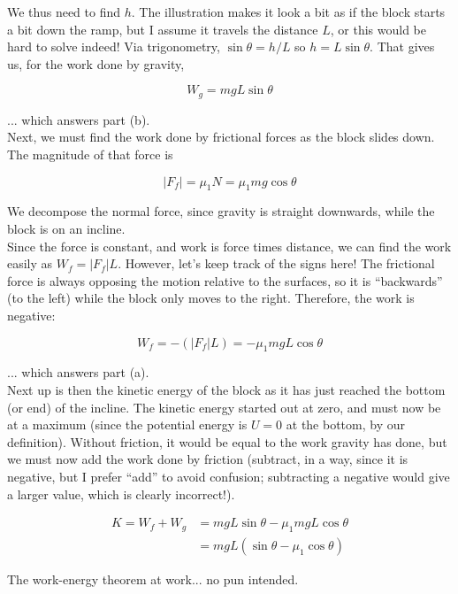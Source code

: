 \documentclass[8.01x]{subfiles}
\begin{document}
We thus need to find $h$. The illustration makes it look a bit as if the block starts a bit down the ramp, but I assume it travels the distance $L$, or this would be hard to solve indeed! Via trigonometry, $\sin \theta = h/L$ so $h = L \sin \theta$. That gives us, for the work done by gravity,

\begin{equation}
W_g = m g L \sin \theta
\end{equation}

... which answers part (b).\\
Next, we must find the work done by frictional forces as the block slides down. The magnitude of that force is

\begin{equation}
|F_f| = \mu_1 N = \mu_1 m g \cos \theta
\end{equation}

We decompose the normal force, since gravity is straight downwards, while the block is on an incline.\\
Since the force is constant, and work is force times distance, we can find the work easily as $W_f = |F_f| L$. However, let's keep track of the signs here! The frictional force is always opposing the motion relative to the surfaces, so it is ``backwards'' (to the left) while the block only moves to the right. Therefore, the work is negative:

\begin{equation}
W_f = -(|F_f| L) = - \mu_1 m g L \cos \theta
\end{equation}

... which answers part (a).\\
Next up is then the kinetic energy of the block as it has just reached the bottom (or end) of the incline. The kinetic energy started out at zero, and must now be at a maximum (since the potential energy is $U = 0$ at the bottom, by our definition). Without friction, it would be equal to the work gravity has done, but we must now add the work done by friction (subtract, in a way, since it is negative, but I prefer ``add'' to avoid confusion; subtracting a negative would give a larger value, which is clearly incorrect!).

\begin{align}
K = W_f + W_g &= m g L \sin \theta - \mu_1 m g L \cos \theta\\
              &= m g L (\sin \theta - \mu_1 \cos \theta)
\end{align}

The work-energy theorem at work... no pun intended.
\end{document}
